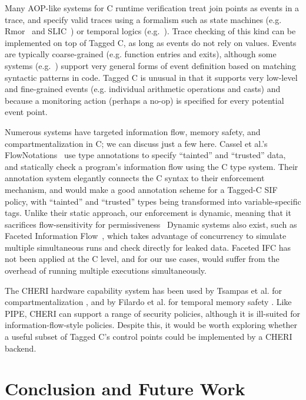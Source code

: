 Many AOP-like systems for C runtime verification treat join points as events in a trace, and specify
valid traces using a formalism such as state machines (e.g. {\sc Rmor}~\cite{Havelund08:RVC} and SLIC~\cite{Ball02:slic})
or temporal logics (e.g.~\cite{Chabot+15}).
Trace checking of this kind can be implemented on top of Tagged C, as long as events do not rely on values.
Events are typically coarse-grained (e.g. function entries and exits), although some systems (e.g.~\cite{engler2000checking})
support very general forms of event definition based on matching syntactic patterns in code. 
Tagged C is unusual in that it supports very low-level and fine-grained events (e.g. individual
arithmetic operations and casts) and because a monitoring action (perhaps a no-op) is specified for every potential event point.

Numerous systems have targeted information flow, memory safety, and compartmentalization in C; we can
discuss just a few here. Cassel et al.'s FlowNotations~\cite{Cassel19:FlowNotation} use type annotations
to specify ``tainted'' and ``trusted'' data, and statically check a program's information flow using the
C type system. Their annotation system elegantly connects the C syntax to their enforcement mechanism,
and would make a good annotation scheme for a Tagged-C SIF policy, with ``tainted'' and ``trusted''
types being transformed into variable-specific tags. Unlike their static approach, our enforcement
is dynamic, meaning that it sacrifices flow-sensitivity for permissiveness~\cite{Russo10:FlowSensitiveAnalysis}
Dynamic systems also exist, such as Faceted Information Flow~\cite{Austin12:Facets},
which takes advantage of concurrency to simulate multiple simultaneous runs and check directly for leaked data.
Faceted IFC has not been applied at the C level, and for our use cases, would suffer from the
overhead of running multiple executions simultaneously.

The CHERI hardware capability system has been used by Tsampas et al. for compartmentalization
\cite{Tsampas2017:TowardsAC}, and by Filardo et al. for temporal memory safety
\cite{NWF20:Cornucopia}. Like PIPE, CHERI can support a range of security policies,
although it is ill-suited for information-flow-style policies. Despite this, it would
be worth exploring whether a useful subset of Tagged C's control points could be implemented
by a CHERI backend.

\section{Conclusion and Future Work}
\label{ch4:sec:conclusion}

